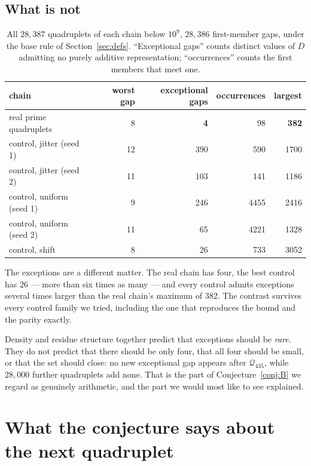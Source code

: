 \documentclass[11pt,a4paper]{article}
\newcommand{\Q}{\mathcal{Q}}
\begin{document}
\subsection*{What is not}

\begin{table}[h]
\centering
\begin{tabular}{lrrrr}
\toprule
chain & worst gap & exceptional gaps & occurrences & largest \\
\midrule
real prime quadruplets & 8 & \textbf{4} & 98 & \textbf{382} \\
control, jitter (seed 1) & 12 & 390 & 590 & 1700 \\
control, jitter (seed 2) & 11 & 103 & 141 & 1186 \\
control, uniform (seed 1) & 9 & 246 & 4455 & 2416 \\
control, uniform (seed 2) & 11 & 65 & 4221 & 1328 \\
control, shift & 8 & 26 & 733 & 3052 \\
\bottomrule
\end{tabular}
\caption{All $28{,}387$ quadruplets of each chain below $10^9$, $28{,}386$
first-member gaps, under the base rule of Section~\ref{sec:defs}.
``Exceptional gaps'' counts distinct values of $D$ admitting no purely
additive representation; ``occurrences'' counts the first members that
meet one.}
\label{tab:controls}
\end{table}

The exceptions are a different matter. The real chain has four, the best
control has $26$ --- more than six times as many --- and every control
admits exceptions several times larger than the real chain's maximum of
$382$. The contrast survives every control family we tried, including the
one that reproduces the bound and the parity exactly.

Density and residue structure together predict that exceptions should be
\emph{rare}. They do not predict that there should be only four, that all
four should be small, or that the set should close: no new exceptional gap
appears after $\Q_{435}$, while $28{,}000$ further quadruplets add none.
That is the part of Conjecture~\ref{conj:B} we regard as genuinely
arithmetic, and the part we would most like to see explained.

\section{What the conjecture says about the next quadruplet}
\label{sec:next}
\end{document}
